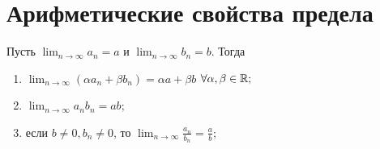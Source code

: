 	\section{Арифметические свойства предела}
	
	\begin{theorem}
		Пусть $\lim_{n \to \infty} a_n = a$ и $\lim_{n \to \infty} b_n = b$. Тогда
		\begin{enumerate}
			\item $\lim_{n \to \infty} (\alpha a_n + \beta b_n) = \alpha a + \beta b$ $\forall \alpha, \beta \in \mathbb R;$
			\item $\lim_{n \to \infty} a_n b_n = ab;$
			\item если $b \neq 0, b_n \neq 0$, то $\lim_{n \to \infty} \frac{a_n}{b_n} = \frac{a}{b};$
		\end{enumerate} 
	\end{theorem}
	
